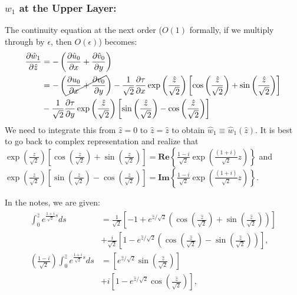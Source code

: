 \documentclass{article}
\newcommand{\pd}[2]{\frac{\partial{#1}}{\partial{#2}}}
\begin{document}
\subsubsection{$w_{1}$ at the Upper Layer:}
The continuity equation at the next order ($O(1)$ formally, if we multiply through by $\epsilon$, then $O(\epsilon)$) becomes:
\begin{align}
 \begin{split}
  \pd{\hat{w}_{1}}{\hat{z}} &= -\left(\pd{\hat{u}_{0}}{x} + \pd{\hat{v}_{0}}{y} \right)\\
  &= -\left(\cancel{\pd{u_{0}}{x} + \pd{v_{0}}{y} }\right) - \frac{1}{\sqrt{2}}\pd{\tau}{x} \exp{\left(\frac{\hat{z}}{\sqrt{2}}\right)}\left[\cos{\left(\frac{\hat{z}}{\sqrt{2}} \right)} + \sin{\left(\frac{\hat{z}}{\sqrt{2}} \right)} \right]\\
  &-\frac{1}{\sqrt{2}}\pd{\tau}{y} \exp{\left(\frac{\hat{z}}{\sqrt{2}}\right)} \left[\sin{\left(\frac{\hat{z}}{\sqrt{2}} \right)} - \cos{\left(\frac{\hat{z}}{\sqrt{2}} \right)} \right]\\
 \end{split}
\end{align}
%
We need to integrate this from $\hat{z} = 0$ to $\hat{z} = \hat{z}$ to obtain $\hat{w}_{1}\equiv \hat{w}_{1}(\hat{z})$. It is best to go back to complex representation and realize that $\exp{\left(\frac{z}{\sqrt{2}}\right)}\left[\cos{\left(\frac{z}{\sqrt{2}} \right)} + \sin{\left(\frac{z}{\sqrt{2}} \right)} \right] = \mathbf{Re}\left\{\frac{1-i}{\sqrt{2}}\exp{\left(\frac{(1+i)}{\sqrt{2}}z\right)} \right\} $ and $\exp{\left(\frac{z}{\sqrt{2}}\right)} \left[\sin{\left(\frac{z}{\sqrt{2}} \right)} - \cos{\left(\frac{z}{\sqrt{2}} \right)} \right] = \mathbf{Im}\left\{\frac{1-i}{\sqrt{2}}\exp{\left(\frac{(1+i)}{\sqrt{2}}z\right)} \right\}$.

In the notes, we are given: 
\begin{align}
 \begin{split}
   \int_{0}^{\hat{z}} e^{\frac{1+i}{\sqrt{2}} s} ds &= \frac{1}{\sqrt{2}} \left[ -1 + e^{\hat{z}/\sqrt{2}} \left(\cos{\left(\frac{\hat{z}}{\sqrt{2}} \right)} + \sin{\left(\frac{\hat{z}}{\sqrt{2}}\right)} \right) \right]\\
   & + \frac{i}{\sqrt{2}} \left[ 1 - e^{\hat{z}/\sqrt{2}} \left(\cos{\left(\frac{\hat{z}}{\sqrt{2}} \right)} - \sin{\left(\frac{\hat{z}}{\sqrt{2}}\right)} \right) \right], \\
   \left(\frac{1-i}{\sqrt{2}}\right)\int_{0}^{\hat{z}} e^{\frac{1+i}{\sqrt{2}} s} ds &= \left[ e^{\hat{z}/\sqrt{2}} \sin{\left(\frac{\hat{z}}{\sqrt{2}}\right)}  \right]\\
   & + i\left[ 1 - e^{\hat{z}/\sqrt{2}} \cos{\left(\frac{\hat{z}}{\sqrt{2}}\right)}  \right], \\
 \end{split}
\end{align}
\end{document}
